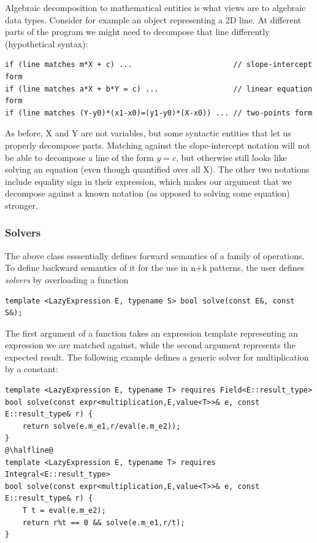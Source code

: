 \documentclass[preprint]{sigplanconf}
\begin{document}
Algebraic decomposition to mathematical entities is what views are to algebraic 
data types. Consider for example an object representing a 2D line. At different 
parts of the program we might need to decompose that line differently (hypothetical syntax):

\begin{lstlisting}[keepspaces,columns=flexible]
if (line matches m*X + c) ...                       // slope-intercept form
if (line matches a*X + b*Y = c) ...                 // linear equation form
if (line matches (Y-y0)*(x1-x0)=(y1-y0)*(X-x0)) ... // two-points form
\end{lstlisting}

As before, X and Y are not variables, but some syntactic entities that let us 
properly decompose parts. Matching against the slope-intercept notation will not 
be able to decompose a line of the form $y=c$, but otherwise still looks like 
solving an equation (even though quantified over all X). The other two notations 
include equality sign in their expression, which makes our argument that we 
decompose against a known notation (as opposed to solving some equation) 
stronger.

\subsubsection{Solvers}

The above class esssentially defines forward semantics of a family of 
operations. To define backward semantics of it for the use in n+k patterns, the 
user defines \emph{solvers} by overloading a function 

\begin{lstlisting}
template <LazyExpression E, typename S> bool solve(const E&, const S&);
\end{lstlisting}

The first argument of a function takes an expression template representing an 
expression we are matched against, while the second argument represents the 
expected result. The following example defines a generic solver for 
multiplication by a constant:

\begin{lstlisting}
template <LazyExpression E, typename T> requires Field<E::result_type>
bool solve(const expr<multiplication,E,value<T>>& e, const E::result_type& r) {
    return solve(e.m_e1,r/eval(e.m_e2));
}
@\halfline@
template <LazyExpression E, typename T> requires Integral<E::result_type>
bool solve(const expr<multiplication,E,value<T>>& e, const E::result_type& r) {
    T t = eval(e.m_e2);
    return r%t == 0 && solve(e.m_e1,r/t);
}
\end{lstlisting}
\end{document}
